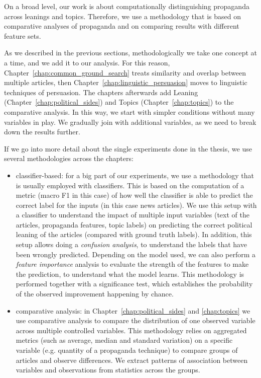 On a broad level, our work is about computationally distinguishing propaganda across leanings and topics. Therefore, we use a methodology that is based on comparative analyses of propaganda and on comparing results with different feature sets.

As we described in the previous sections, methodologically we take one concept at a time, and we add it to our analysis. For this reason, Chapter~\ref{chap:common_ground_search} treats similarity and overlap between multiple articles, then Chapter~\ref{chap:linguistic_persuasion} moves to linguistic techniques of persuasion. The chapters afterwards add Leaning (Chapter~\ref{chap:political_sides}) and Topics (Chapter~\ref{chap:topics}) to the comparative analysis. In this way, we start with simpler conditions without many variables in play. We gradually join with additional variables, as we need to break down the results further.


If we go into more detail about the single experiments done in the thesis, we use several methodologies across the chapters:
\begin{itemize}
    \item classifier-based: for a big part of our experiments, we use a methodology that is usually employed with classifiers. This is based on the computation of a metric (macro F1 in this case) of how well the classifier is able to predict the correct label for the inputs (in this case news articles). We use this setup with a classifier to understand the impact of multiple input variables (text of the articles, propaganda features, topic labels) on predicting the correct political leaning of the articles (compared with ground truth labels). In addition, this setup allows doing a \emph{confusion analysis}, to understand the labels that have been wrongly predicted. Depending on the model used, we can also perform a \emph{feature importance} analysis to evaluate the strength of the features to make the prediction, to understand what the model learns. This methodology is performed together with a significance test, which establishes the probability of the observed improvement happening by chance.
    \item comparative analysis: in Chapter~\ref{chap:political_sides} and \ref{chap:topics} we use comparative analysis to compare the distribution of one observed variable across multiple controlled variables. This methodology relies on aggregated metrics (such as average, median and standard variation) on a specific variable (e.g. quantity of a propaganda technique) to compare groups of articles and observe differences. We extract patterns of association between variables and observations from statistics across the groups.
\end{itemize}


